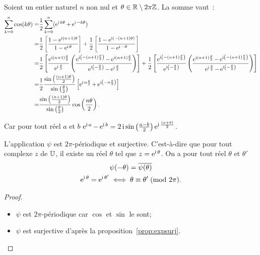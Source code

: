 Soient un entier naturel \(n\) non nul et \(\theta \in \mathbb{R} \setminus 2\pi\mathbb{Z}\). La 
somme vaut~:
\begin{align*}
    \sum_{k = 0}^n \cos(k\theta)  = & \frac{1}{2} \sum_{k = 0}^n (\operatorname{e}^{\operatorname{i} k 
    \theta} + \operatorname{e}^{\operatorname{i} -k \theta})\\
     = &\frac{1}{2} \left[\frac{1-\operatorname{e}^{\operatorname{i} (n + 
     1) \theta}}{1-\operatorname{e}^{\operatorname{i} \theta}} \right] + \frac{1}{2} 
     \left[ \frac{1-\operatorname{e}^{\operatorname{i} (-(n + 1)\theta)}}{1-\operatorname{e}^{\operatorname{i} -\theta}} \right]\\
     = &\frac{1}{2} \left[ \frac{\operatorname{e}^{\operatorname{i} (n + 1) 
     \frac{\theta}{2}}}{\operatorname{e}^{\operatorname{i} \frac{\theta}{2}}} \left( \frac{\operatorname{e}^{\operatorname{i} \left( 
    -(n + 1) \frac{\theta}{2} \right)} - \operatorname{e}^{\operatorname{i} (n + 1) 
    \frac{\theta}{2}}}{\operatorname{e}^{\operatorname{i} \left( -\frac{\theta}{2} \right)} - 
    \operatorname{e}^{\operatorname{i} \frac{\theta}{2}}} \right) \right] \notag + \frac{1}{2} \left[ 
    \frac{\operatorname{e}^{\operatorname{i} \left( -(n + 1) \frac{\theta}{2} \right)}}{\operatorname{e}^{\operatorname{i} \left( 
    -\frac{\theta}{2} \right)}} \left( \frac{\operatorname{e}^{\operatorname{i} (n + 1) 
    \frac{\theta}{2}}-\operatorname{e}^{\operatorname{i} \left( -(n + 1) \frac{\theta}{2} 
    \right)}}{\operatorname{e}^{\operatorname{i} \frac{\theta}{2}} - \operatorname{e}^{\operatorname{i} \left( -\frac{\theta}{2} 
    \right)}} \right) \right] \\
     = & \frac{1}{2} \frac{\sin \left( \frac{(n + 1)\theta}{2} \right)}{\sin 
     \left( \frac{\theta}{2} \right)} \left[ \operatorname{e}^{\operatorname{i} n \frac{\theta}{2}} + 
     \operatorname{e}^{\operatorname{i} \left( -n \frac{\theta}{2} \right)} \right] \\
     = & \frac{\sin \left( \frac{(n + 1)\theta}{2} \right)}{\sin \left( 
     \frac{\theta}{2} \right)} \cos \left( \frac{n\theta}{2} \right).
\end{align*}

Car pour tout réel \(a\) et \(b\) \(\operatorname{e}^{\operatorname{i} a}-\operatorname{e}^{\operatorname{i} b} = 2\operatorname{i} 
\sin\left(\frac{a-b}{2}\right)\operatorname{e}^{\operatorname{i} \frac{(a + b)}{2}}\).

\begin{prop}
    L'application \(\psi\) est  \(2\pi\)-périodique et surjective. C'est-à-dire 
    que pour tout complexe \(z\) de \(\mathbb{U}\), il existe un réel \(\theta\) tel que 
    \(z = \operatorname{e}^{\operatorname{i} \theta}\). On a pour tout réel \(\theta\) et \(\theta'\)
    \begin{gather}
        \psi(-\theta) = \overline{\psi(\theta)}\\
        \operatorname{e}^{\operatorname{i} \theta} = \operatorname{e}^{\operatorname{i} \theta'} \iff \theta \equiv \theta'\!\pmod {2\pi}.
    \end{gather}
\end{prop}

\begin{proof}
    \begin{itemize}
        \item \(\psi\) est \(2\pi\)-périodique car \(\cos\) et \(\sin\) le sont;
        \item \(\psi\) est surjective d'après la proposition~\ref{prop:expsurj}.
    \end{itemize}
\end{proof}

